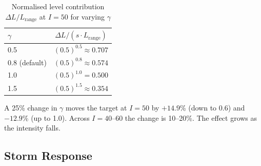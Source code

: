 \documentclass[11pt,a4paper]{article}
\newcommand{\sgGammaUp}{14.9}
\newcommand{\sgGammaDown}{12.9}
\newcommand{\sgGammaLo}{10}
\newcommand{\sgGammaHi}{20}
\begin{document}
\begin{table}[H]
    \centering
    \caption{Normalised level contribution $\Delta L / L_{\text{range}}$ at $I = 50$ for varying $\gamma$}
    \label{tab:gamma_sensitivity}
    \begin{tabular}{lc}
        \toprule
        \textbf{$\gamma$} & \textbf{$\Delta L / (s \cdot L_{\text{range}})$} \\
        \midrule
        0.5 & $(0.5)^{0.5} \approx 0.707$ \\
        0.8 (default) & $(0.5)^{0.8} \approx 0.574$ \\
        1.0 & $(0.5)^{1.0} = 0.500$ \\
        1.5 & $(0.5)^{1.5} \approx 0.354$ \\
        \bottomrule
    \end{tabular}
\end{table}

\noindent A 25\% change in $\gamma$ moves the target at $I=50$ by $+\sgGammaUp$\% (down
to 0.6) and $-\sgGammaDown$\% (up to 1.0). Across $I=40$--60 the change is
\sgGammaLo--\sgGammaHi\%. The effect grows as the intensity falls.

\subsection{Storm Response}
\end{document}
